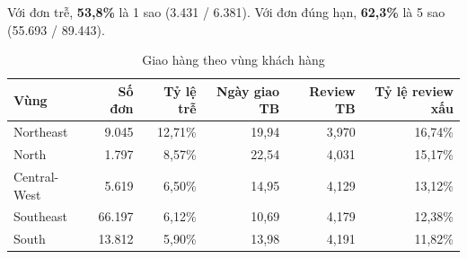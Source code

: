 \documentclass[12pt,a4paper]{report}
\renewcommand{\_}{\oldunderscore\allowbreak}
\begin{document}
Với đơn trễ, \textbf{53,8\%} là 1 sao (3.431 / 6.381). Với đơn đúng hạn, \textbf{62,3\%} là 5 sao (55.693 / 89.443).

\begin{table}[H]
\centering\small
\caption{Giao hàng theo vùng khách hàng}
\begin{tabular}{lrrrrr}
\toprule
Vùng & Số đơn & Tỷ lệ trễ & Ngày giao TB & Review TB & Tỷ lệ review xấu \\
\midrule
Northeast & 9.045 & 12,71\% & 19,94 & 3,970 & 16,74\% \\
North & 1.797 & 8,57\% & 22,54 & 4,031 & 15,17\% \\
Central-West & 5.619 & 6,50\% & 14,95 & 4,129 & 13,12\% \\
Southeast & 66.197 & 6,12\% & 10,69 & 4,179 & 12,38\% \\
South & 13.812 & 5,90\% & 13,98 & 4,191 & 11,82\% \\
\bottomrule
\end{tabular}
\end{table}
\end{document}
